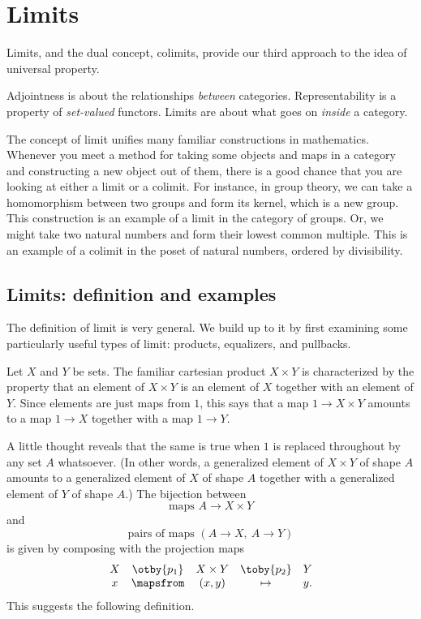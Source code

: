 % 
% 
% 

\chapter{Limits}
\label{ch:lims}


Limits, and the dual concept, colimits, provide our third approach to the
idea of universal property.  

Adjointness is about the relationships \emph{between} categories.
Representability is a property of \emph{set-valued} functors.  Limits are
about what goes on \emph{inside} a category.

The concept of limit unifies many familiar constructions in mathematics.
Whenever you meet a method for taking some objects and maps in a category
and constructing a new object out of them, there is a good chance that you
are looking at either a limit or a colimit.  For instance, in group theory,
we can take a homomorphism between two groups and form its kernel, which
is a new group.  This construction is an example of a limit in the category
of groups.  Or, we might take two natural numbers and form their lowest
common multiple.  This is an example of a colimit in the poset of natural
numbers, ordered by divisibility.



\section{Limits: definition and examples}
\label{sec:lims-basics}


The definition of limit is very general.  We build up to it by first
examining some particularly useful types of limit: products, equalizers,
and pullbacks.




Let $X$ and $Y$ be sets.  The familiar cartesian product%
%
%
$X \times Y$ is characterized by the property that an element of $X \times
Y$ is an element of $X$ together with an element of $Y$.  Since elements
are just maps from $1$, this says that a map $1 \to X \times Y$ amounts to
a map $1 \to X$ together with a map $1 \to Y$.

A little thought reveals that the same is true when $1$ is replaced
throughout by any set $A$ whatsoever.  (In other words, a generalized
element of $X \times Y$ of shape $A$ amounts to a generalized element of
$X$ of shape $A$ together with a generalized element of $Y$ of shape $A$.)
The bijection between
\[
\text{maps } A \to X \times Y
\]
and
\[
\text{pairs of maps } (A \to X,\ A \to Y)
\]
is given by composing with the projection maps
\[
\begin{array}{ccccc}
X       &\otby{p_1}     &X \times Y     &\toby{p_2}     &Y      \\
x       &\mapsfrom      &(x, y)         &\mapsto        &y.
\end{array}
\]
This suggests the following definition.

